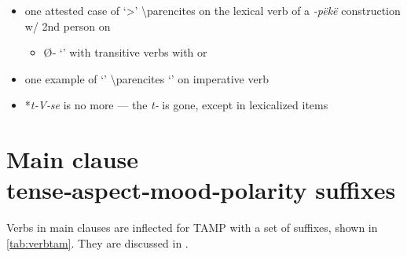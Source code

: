 \documentclass{memoir}
\begin{document}
\begin{itemize}
\item
  one attested case of  `\textgreater{}'
  \textbackslash parencites on the lexical verb of a \emph{-pëkë}
  construction w/ 2nd person  on 

  \begin{itemize}
  \tightlist
  \item
    Ø‑ `' with transitive verbs with  or
  \end{itemize}
\item
  one example of  `' \textbackslash parencites
  `' on imperative verb
\item
  *\emph{t‑V‑se} is no more --- the \emph{t‑} is gone, except in
  lexicalized items
\end{itemize}

\section{\texorpdfstring{Main clause tense‑aspect‑mood‑polarity suffixes
\label{sec:tam}}{Main clause tense‑aspect‑mood‑polarity suffixes }}

Verbs in main clauses are inflected for TAMP with a set of suffixes,
shown in \cref{tab:verbtam}. They are discussed in
.
\end{document}
